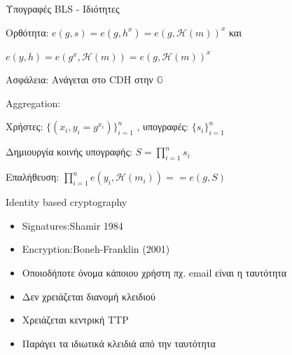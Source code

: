 \documentclass[handout]{beamer}
\begin{document}
\begin{frame}{Υπογραφές BLS - Ιδιότητες} 
	\begin{block}{Ορθότητα:}
	$e(g,s) = e(g,h^x) = e(g,\mathcal{H}(m))^x$ και  \pause

	$e(y,h) = e(g^x,\mathcal{H}(m)) = e(g,\mathcal{H}(m))^x$  \pause
	\end{block}
	\begin{block}{Ασφάλεια:}
	Ανάγεται στο CDH στην $\mathbb{G}$
	\end{block} \pause
	\begin{block}{Aggregation:} 

	Χρήστες: $\{(x_i, y_i = g^{x_i}) \}_{i=1}^n$ , υπογραφές: $\{ s_i \}_{i=1}^n$ \pause

	Δημιουργία κοινής υπογραφής: $S = \prod_{i=1}^n s_i$ \pause

	Επαλήθευση: $\prod_{i=1}^n e(y_i,\mathcal{H}(m_i)) == e(g,S)$
	\end{block}	
\end{frame}

\begin{frame}{Identity based cryptography}
	\begin{itemize}
		\item Signatures:Shamir 1984 \pause
		\item Encryption:Boneh-Franklin (2001) \pause
		\item Οποιοδήποτε όνομα κάποιου χρήστη πχ. email είναι η ταυτότητα \pause
		\item Δεν χρειάζεται διανομή κλειδιού \pause
		\item Χρειάζεται κεντρική TTP \pause
		\item Παράγει τα ιδιωτικά κλειδιά από την ταυτότητα \pause
	\end{itemize}
	\end{frame}
	
\end{document}
